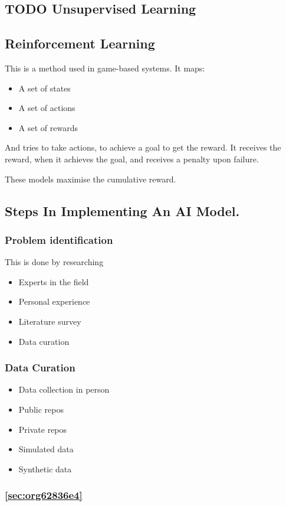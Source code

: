 \documentclass[11pt]{article}
\begin{document}
\subsection{{\bfseries\sffamily TODO} Unsupervised Learning}
\label{sec:org5a776ae}
\subsection{Reinforcement Learning}
\label{sec:orgb527585}
This is a method used in game-based systems.
It maps:
\begin{itemize}
\item A set of states
\item A set of actions
\item A set of rewards
\end{itemize}

And tries to take actions, to achieve a goal to get the reward. It receives the reward, when it achieves the goal, and receives a penalty upon failure.

These models maximise the cumulative reward.
\subsection{Steps In Implementing An AI Model.}
\label{sec:org9da5299}
\subsubsection{Problem identification}
\label{sec:org97027d0}
This is done by researching
\begin{itemize}
\item Experts in the field
\item Personal experience
\item Literature survey
\item Data curation
\end{itemize}
\subsubsection{Data Curation}
\label{sec:orgca8d36e}
\begin{itemize}
\item Data collection in person
\item Public repos
\item Private repos
\item Simulated data
\item Synthetic data
\end{itemize}
\subsubsection{\ref{sec:org62836e4}}
\label{sec:org4754cea}
\end{document}
